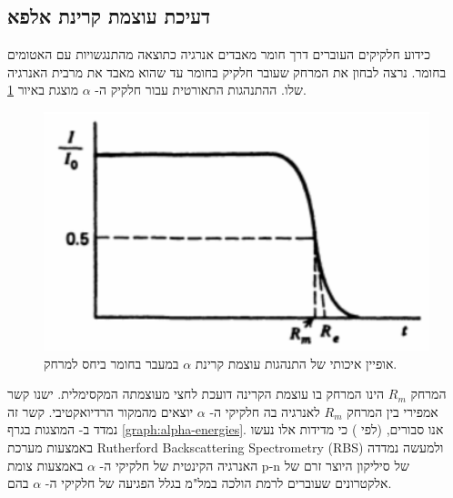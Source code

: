 \documentclass{article}
\begin{document}
\subsection{
דעיכת עוצמת קרינת אלפא
}

כידוע חלקיקים העוברים דרך חומר מאבדים אנרגיה כתוצאה מהתנגשויות עם האטומים בחומר.
נרצה לבחון את המרחק שעובר חלקיק בחומר עד שהוא מאבד את מרבית האנרגיה שלו.
ההתנהגות התאורטית עבור חלקיק ה- 
$\alpha$
מוצגת באיור
\ref{fig:alphaDecay}.

\begin{figure}[ht!]
    \centering
    \includegraphics{alphaRadiation.png}
    \caption{
    אופיין איכותי של התנהגות עוצמת קרינת 
    $\alpha$
    במעבר בחומר ביחס למרחק.
    }
    \label{fig:alphaDecay}
\end{figure}

המרחק
$R_m$
הינו המרחק בו עוצמת הקרינה דועכת לחצי מעוצמתה המקסימלית. ישנו קשר אמפירי בין המרחק
$R_m$
לאנרגיה בה חלקיקי ה-
$\alpha$
יוצאים מהמקור הרדיואקטיבי. קשר זה נמדד ב-
\cite{RadiologicalHandbook}
המוצגות בגרף
\ref{graph:alpha-energies}.
אנו סבורים,
(לפי
\cite{SE_alpha_energy})
כי מדידות אלו נעשו באמצעות מערכת 
\textenglish{Rutherford Backscattering Spectrometry (RBS)}
ולמעשה נמדדה האנרגיה הקינטית של חלקיקי ה-
$\alpha$
באמצעות צומת
\textenglish{p-n}
של סיליקון היוצר זרם של אלקטרונים שעוברים לרמת הולכה במל"מ בגלל הפגיעה של חלקיקי ה-
$\alpha$
בהם.
\end{document}
